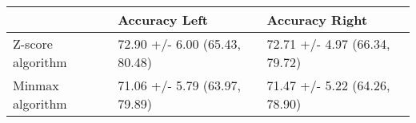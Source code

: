 \begin{tabular}{lll}
\toprule
{} &                  Accuracy Left &                 Accuracy Right \\
\midrule
Z-score algorithm &  72.90 +/- 6.00 (65.43, 80.48) &  72.71 +/- 4.97 (66.34, 79.72) \\
Minmax algorithm  &  71.06 +/- 5.79 (63.97, 79.89) &  71.47 +/- 5.22 (64.26, 78.90) \\
\bottomrule
\end{tabular}
